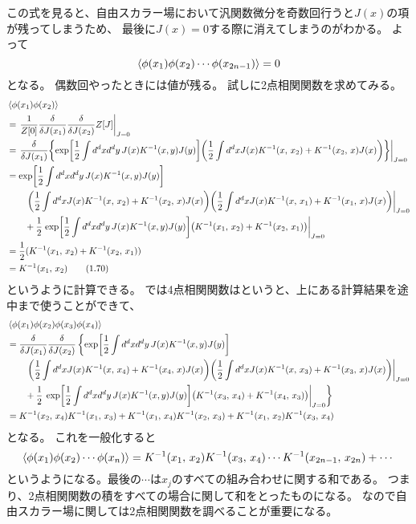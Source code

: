 \documentclass[../../master.tex]{subfiles}
\begin{document}
この式を見ると、自由スカラー場において汎関数微分を奇数回行うと\(J(x)\)の項が残ってしまうため、
最後に\(J(x)=0\)する際に消えてしまうのがわかる。
よって
\begin{equation}
    \ev{\phi(x_1)\phi(x_2)\cdots\phi(x_{2n-1})}=0
\end{equation}
となる。
偶数回やったときには値が残る。
試しに2点相関関数を求めてみる。
\begin{align*}
    &\ev{\phi(x_1)\phi(x_2)}\\
    &=\left.\frac{1}{Z[0]}\fdv{J(x_1)}\fdv{J(x_2)}Z[J]\right|_{J=0}\\
    &=\left.\fdv{J(x_1)}\qty{\exp[\frac{1}{2}\int d^dxd^dy\,J(x)K^{-1}(x,y)J(y)]
    \qty(\frac{1}{2}\int d^dx J(x)K^{-1}(x,\,x_2)+K^{-1}(x_2,\,x)J(x))}\right|_{J=0}\\
    &=\exp[\frac{1}{2}\int d^dxd^dy\,J(x)K^{-1}(x,y)J(y)]\\
    &\left.\qquad\qty(\frac{1}{2}\int d^dx J(x)K^{-1}(x,\,x_2)+K^{-1}(x_2,\,x)J(x))
    \qty(\frac{1}{2}\int d^dx J(x)K^{-1}(x,\,x_1)+K^{-1}(x_1,\,x)J(x))
    \right|_{J=0}\\
    &\qquad+\frac{1}{2}\left.\exp[\frac{1}{2}\int d^dxd^dy\,J(x)K^{-1}(x,y)J(y)]
    \qty(K^{-1}(x_1,\,x_2)+K^{-1}(x_2,\,x_1))
    \right|_{J=0}\\
    &=\frac{1}{2}(K^{-1}(x_1,\,x_2)+K^{-1}(x_2,\,x_1))\\
    &=K^{-1}(x_1,\,x_2) \tag{1.70}
\end{align*}
というように計算できる。
では4点相関関数はというと、上にある計算結果を途中まで使うことができて、
\begin{align*}
    &\ev{\phi(x_1)\phi(x_2)\phi(x_3)\phi(x_4)}\\
    &=\fdv{J(x_1)}\fdv{J(x_2)}\left\{
        \exp[\frac{1}{2}\int d^dxd^dy\,J(x)K^{-1}(x,y)J(y)]\right.\\
    &\left.\qquad\qty(\frac{1}{2}\int d^dx J(x)K^{-1}(x,\,x_4)+K^{-1}(x_4,\,x)J(x))
    \qty(\frac{1}{2}\int d^dx J(x)K^{-1}(x,\,x_3)+K^{-1}(x_3,\,x)J(x))
    \right|_{J=0}\\
    &\qquad+\frac{1}{2}\left.\left.\exp[\frac{1}{2}\int d^dxd^dy\,J(x)K^{-1}(x,y)J(y)]
    \qty(K^{-1}(x_3,\,x_4)+K^{-1}(x_4,\,x_3))
    \right|_{J=0}\right\}\\
    &=K^{-1}(x_2,\,x_4)K^{-1}(x_1,\,x_3)+K^{-1}(x_1,\,x_4)K^{-1}(x_2,\,x_3)+K^{-1}(x_1,\,x_2)K^{-1}(x_3,\,x_4)
\end{align*}
となる。
これを一般化すると
\begin{equation}
    \ev{\phi(x_1)\phi(x_2)\cdots\phi(x_n)}
    = K^{-1}(x_1,\,x_2)K^{-1}(x_3,\,x_4)\cdots K^{-1}(x_{2n-1},\,x_{2n})
    + \cdots
\end{equation}
というようになる。最後の\(\cdots\)は\(x_j\)のすべての組み合わせに関する和である。
つまり、2点相関関数の積をすべての場合に関して和をとったものになる。
なので自由スカラー場に関しては2点相関関数を調べることが重要になる。
\end{document}
